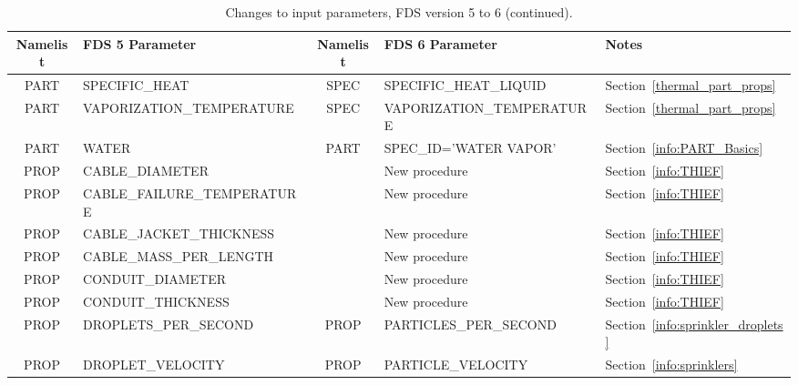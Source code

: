 \documentclass[11pt]{book}
\begin{document}
\begin{table}
\caption[List of changes to input parameters for FDS 6 (continued)]{Changes to input parameters, FDS version 5 to 6 (continued).}
\label{tbl:Changes2}
\centering
\begin{tabular}{@{\extracolsep{\fill}}|c|l|c|l|l|}
\hline
Namelist      & FDS 5 Parameter                     & Namelist     & FDS 6 Parameter & Notes \\ \hline \hline
{\ct PART}    & {\ct SPECIFIC\_HEAT}                &  {\ct SPEC}  & {\ct SPECIFIC\_HEAT\_LIQUID}                & Section~\ref{thermal_part_props}        \\ \hline
{\ct PART}    & {\ct VAPORIZATION\_TEMPERATURE}     &  {\ct SPEC}  & {\ct VAPORIZATION\_TEMPERATURE}             & Section~\ref{thermal_part_props}        \\ \hline
{\ct PART}    & {\ct WATER}                         &  {\ct PART}  & {\ct SPEC\_ID='WATER VAPOR'}                & Section~\ref{info:PART_Basics}          \\ \hline
{\ct PROP}    & {\ct CABLE\_DIAMETER}               &              & New procedure                               & Section~\ref{info:THIEF}                \\ \hline
{\ct PROP}    & {\ct CABLE\_FAILURE\_TEMPERATURE}   &              & New procedure                               & Section~\ref{info:THIEF}                \\ \hline
{\ct PROP}    & {\ct CABLE\_JACKET\_THICKNESS}      &              & New procedure                               & Section~\ref{info:THIEF}                \\ \hline
{\ct PROP}    & {\ct CABLE\_MASS\_PER\_LENGTH}      &              & New procedure                               & Section~\ref{info:THIEF}                \\ \hline
{\ct PROP}    & {\ct CONDUIT\_DIAMETER}             &              & New procedure                               & Section~\ref{info:THIEF}                \\ \hline
{\ct PROP}    & {\ct CONDUIT\_THICKNESS}            &              & New procedure                               & Section~\ref{info:THIEF}                \\ \hline
{\ct PROP}    & {\ct DROPLETS\_PER\_SECOND}         &  {\ct PROP}  & {\ct PARTICLES\_PER\_SECOND}                & Section~\ref{info:sprinkler_droplets}   \\ \hline
{\ct PROP}    & {\ct DROPLET\_VELOCITY}             &  {\ct PROP}  & {\ct PARTICLE\_VELOCITY}                    & Section~\ref{info:sprinklers}           \\ \hline

\end{tabular}
\end{table}
\end{document}
